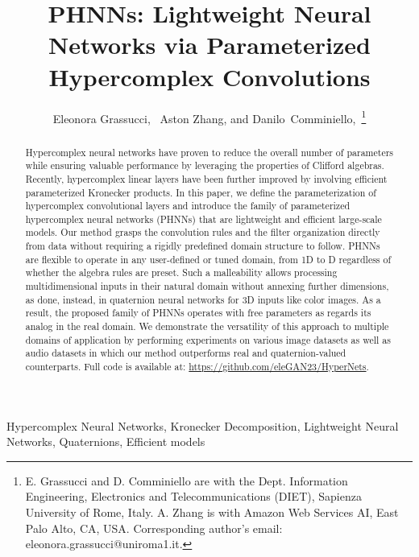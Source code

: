\documentclass[lettersize,journal]{IEEEtran}
\begin{document}
\title{PHNNs: Lightweight Neural Networks via Parameterized Hypercomplex Convolutions}

\author{Eleonora Grassucci,~ Aston Zhang, and Danilo~Comminiello,~\thanks{E. Grassucci and D. Comminiello are with the Dept. Information Engineering, Electronics and Telecommunications (DIET), Sapienza University of Rome, Italy. A. Zhang is with Amazon Web Services AI, East Palo Alto, CA, USA. Corresponding author's email: eleonora.grassucci@uniroma1.it.}}





\maketitle

\begin{abstract}
Hypercomplex neural networks have proven to reduce the overall number of parameters while ensuring valuable performance by leveraging the properties of Clifford algebras. Recently, hypercomplex linear layers have been further improved by involving efficient parameterized Kronecker products. In this paper, we define the parameterization of hypercomplex convolutional layers and introduce the family of parameterized hypercomplex neural networks (PHNNs) that are lightweight and efficient large-scale models. Our method grasps the convolution rules and the filter organization directly from data without requiring a rigidly predefined domain structure to follow. PHNNs are flexible to operate in any user-defined or tuned domain, from 1D to D regardless of whether the algebra rules are preset.
Such a malleability allows processing multidimensional inputs in their natural domain without annexing further dimensions, as done, instead, in quaternion neural networks for 3D inputs like color images.
As a result, the proposed family of PHNNs operates with  free parameters as regards its analog in the real domain. We demonstrate the versatility of this approach to multiple domains of application by performing experiments on various image datasets as well as audio datasets in which our method outperforms real and quaternion-valued counterparts. Full code is available at: \url{https://github.com/eleGAN23/HyperNets}.
\end{abstract}

\begin{IEEEkeywords}
Hypercomplex Neural Networks, Kronecker Decomposition, Lightweight Neural Networks, Quaternions, Efficient models
\end{IEEEkeywords}
\end{document}
